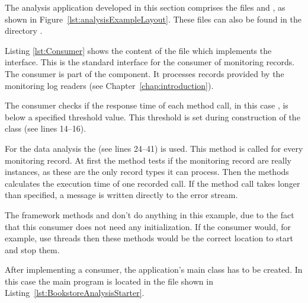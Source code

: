 \noindent The analysis application developed in this section comprises the files %
 and , as shown in Figure~\ref{lst:analysisExampleLayout}. %
These files can also be found in the directory \dir{\manualInstrumentedBookstoreApplicationDir{}/}. 

Listing \ref{lst:Consumer} shows the content of the  file which implements the  interface. This is the standard interface for the consumer of \Kieker{} monitoring records. The consumer is part of the \KiekerAnalysisPart{} component. It processes records provided by the monitoring log readers (see Chapter~\ref{chap:introduction}). %

\setJavaCodeListing       



\noindent The consumer checks if the response time of each method call, in this case , is below %
a specified threshold value. %
This threshold is set during construction of the  class (see lines 14--16). 

For the data analysis the  (see lines 24--41) is used. This method is called for every monitoring record. At first the method tests if the monitoring record are really  instances, as these are the only record types it can process. Then the methods calculates the execution time of one recorded  call. If the method call takes longer than specified, a message is written directly to the error stream.

The framework methods  and  don't do anything %
in this example, due to the fact that this consumer does not need any initialization. If the consumer would, for example, use threads then these methods would be the correct location to start and stop them.

After implementing a consumer, the application's main class has to be created. In this case the main program is located in the  file shown in Listing~\ref{lst:BookstoreAnalysisStarter}.

\setJavaCodeListing       


